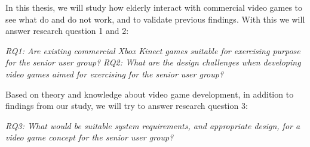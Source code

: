 In this thesis, we will study how elderly interact with commercial video games to see what do and do not work, and to validate previous findings. With this we will answer research question 1 and 2: 

\emph{RQ1: Are existing commercial Xbox Kinect games suitable for exercising purpose for the senior user group?} 
\emph{RQ2: What are the design challenges when developing video games aimed for exercising for the senior user group?}

Based on theory and knowledge about video game development, in addition to findings from our study, we will try to answer research question 3:

\emph{RQ3: What would be suitable system requirements, and appropriate design, for a video game concept for the senior user group?}

